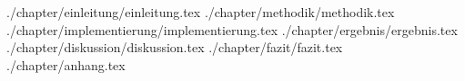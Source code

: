 

\usepackage{import}


\date{16. September 2016}





\tableofcontents
\cleardoubleoddemptypage
{}
\setcounter{page}{1}
{./chapter/einleitung/einleitung.tex}
{./chapter/methodik/methodik.tex}
{./chapter/implementierung/implementierung.tex}
{./chapter/ergebnis/ergebnis.tex}
{./chapter/diskussion/diskussion.tex}
{./chapter/fazit/fazit.tex}
{./chapter/anhang.tex}

\appendix %
\printbibliography


